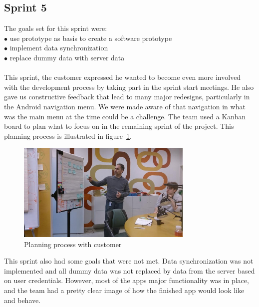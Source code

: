 \subsection{Sprint 5}
The goals set for this sprint were:\\
$\bullet$\hspace{0.25cm} use prototype as basis to create a software prototype\\
$\bullet$\hspace{0.25cm} implement data synchronization\\
$\bullet$\hspace{0.25cm} replace dummy data with server data\\\\
This sprint, the customer expressed he wanted to become even more involved with the development process by taking part in the sprint start meetings.
He also gave us constructive feedback that lead to many major redesigns, particularly in the Android navigation menu. We were made aware of that navigation in what was the main menu at the time could be a challenge. The team used a Kanban board to plan what to focus on in the remaining sprint of the project. This planning process is illustrated in figure~\ref{fig:kanban}.

\begin{figure}[htp]
\centering
\includegraphics[width=0.75\textwidth, clip, trim=5cm 0cm 0cm 0cm]{ch/devProcess/fig/kanban.jpg}
\caption{Planning process with customer}
\label{fig:kanban}
\end{figure}

\noindent This sprint also had some goals that were not met. Data synchronization was not implemented and all dummy data was not replaced by data from the server based on user credentials. However, most of the apps major functionality was in place, and the team had a pretty clear image of how the finished app would look like and behave.

